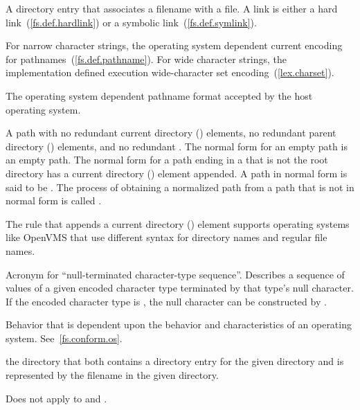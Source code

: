 A directory entry  that associates a
filename with a file. A link is either a hard link~(\ref{fs.def.hardlink}) or a
symbolic link~(\ref{fs.def.symlink}).

For narrow character strings, the operating system dependent current encoding
for pathnames~(\ref{fs.def.pathname}). For wide character strings, the implementation defined execution
wide-character set encoding~(\ref{lex.charset}).

The operating system dependent pathname format accepted by the host operating system.

A path with no redundant current directory () elements,
no redundant parent directory () elements, and
no redundant .
The normal form for an empty path is an empty path.
The normal form for a path ending in a 
that is not the root directory
has a current directory () element appended.
A path in normal form is said to be .
The process of obtaining a normalized path
from a path that is not in normal form is called .
\begin{note} The rule that appends a current directory () element
supports operating systems like OpenVMS
that use different syntax for directory names and regular file names.
\end{note}

Acronym for ``null-terminated character-type sequence''. Describes a sequence
of values of a given encoded character type terminated by that type's null character. If
the encoded character type is , the null character can be constructed
by .

Behavior that is dependent upon the behavior
and characteristics of an operating system. See~\ref{fs.conform.os}.

 the directory that both contains a
directory entry for the given directory and is represented by the filename
 in the given directory.
\begin{note} Does not apply to  and . \end{note}

